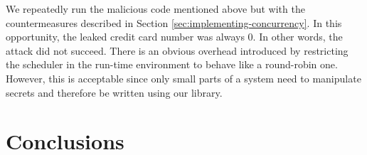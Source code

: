 \documentclass[times, 10pt,twocolumn]{article}
\begin{document}
We repeatedly run the malicious code mentioned above but with 
the countermeasures described 
in Section \ref{sec:implementing-concurrency}. 
In this opportunity, the leaked credit card number was always $0$. 
In other words, the attack did 
not succeed. There is an obvious overhead introduced by restricting the
scheduler in the run-time environment to behave like a round-robin
one. 
However, this is acceptable since only small parts of a system need to
manipulate secrets and therefore be written using our library.





 






\section{Conclusions} \label{sec:conclusions}
\end{document}
